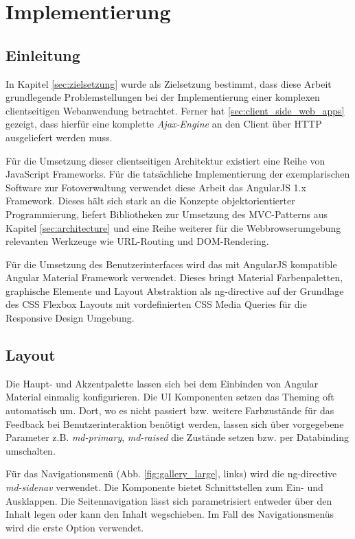 \chapter{Implementierung}

\section{Einleitung}

In Kapitel \ref{sec:zielsetzung} wurde als Zielsetzung bestimmt, dass diese Arbeit grundlegende Problemstellungen bei der Implementierung einer komplexen clientseitigen Webanwendung betrachtet. Ferner hat \ref{sec:client_side_web_apps} gezeigt, dass hierfür eine komplette \emph{Ajax-Engine} an den Client über HTTP ausgeliefert werden muss.

Für die Umsetzung dieser clientseitigen Architektur existiert eine Reihe von JavaScript Frameworks. Für die tatsächliche Implementierung der exemplarischen Software zur Fotoverwaltung verwendet diese Arbeit das AngularJS 1.x Framework. Dieses hält sich stark an die Konzepte objektorientierter Programmierung, liefert Bibliotheken zur Umsetzung des MVC-Patterns aus Kapitel \ref{sec:architecture} und eine Reihe weiterer für die Webbrowserumgebung relevanten Werkzeuge wie URL-Routing und DOM-Rendering.

Für die Umsetzung des Benutzerinterfaces wird das mit AngularJS kompatible Angular Material Framework verwendet. Dieses bringt Material Farbenpaletten, graphische Elemente und Layout Abstraktion als \gls{ng-directive} auf der Grundlage des CSS Flexbox Layouts mit vordefinierten CSS Media Queries für die Responsive Design Umgebung.

\section{Layout}

Die Haupt- und Akzentpalette lassen sich bei dem Einbinden von Angular Material einmalig konfigurieren. Die UI Komponenten setzen das Theming oft automatisch um.
Dort, wo es nicht passiert bzw. weitere Farbzustände für das Feedback bei Benutzerinteraktion benötigt werden, lassen sich über vorgegebene Parameter z.B. \emph{md-primary}, \emph{md-raised} die Zustände setzen bzw. per Databinding umschalten.

Für das Navigationsmenü (Abb. \ref{fig:gallery_large}, links) wird die \gls{ng-directive} \emph{md-sidenav} verwendet. Die Komponente bietet Schnittstellen zum Ein- und Ausklappen. Die Seitennavigation lässt sich parametrisiert entweder über den Inhalt legen oder kann den Inhalt wegschieben. Im Fall des Navigationsmenüs wird die erste Option verwendet.

